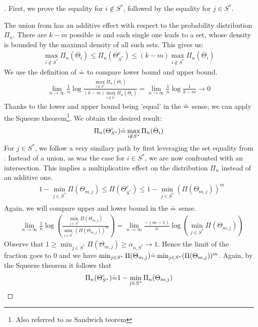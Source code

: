 \begin{proof}[]
  First, we prove the equality for $i \notin S^*$, followed by the equality for
  $j \in S^*$.

  The union from  has an additive effect with
  respect to the probability distribution $\Pi_n$. There are $k-m$ possible $i$s
  and each single one leads to a set, whose density is bounded by the maximal
  density of all such sets. This gives us:
  \begin{align}
    \max_{i \notin S^*} \Pi_n(\bar{\Theta}_i) \leq \Pi_n(\Theta_{S^*}^c) \leq (k-m) \max_{i \notin S^*} \Pi_n(\bar{\Theta}_i)
  \end{align}
  We use the definition of $\dot{=}$ to compare lower bound and upper bound.
  \begin{align}
    \lim_{n \rightarrow \infty} \frac{1}{n} \log{\frac{\max_{i \notin S^*} \Pi_n(\bar{\Theta}_i)}{(k-m)\max_{i \notin S^*} \Pi_n(\bar{\Theta}_i)}}
    = \lim_{n \rightarrow \infty} \frac{1}{n} \log{\frac{1}{k-m}} \rightarrow 0
  \end{align}
  Thanks to the lower and upper bound being 'equal' in the $\dot{=}$ sense, we can
  apply the Squeeze theorem\footnote{Also referred to as Sandwich teorem}. We
  obtain the desired result:
  \begin{align}
    \Pi_n(\Theta_{S^*}^c) \dot{=} \max_{i \notin S^*} \Pi_n(\bar{\Theta}_i)
  \end{align}
  For $j \in S^*$, we follow a very similary path by first leveraging the set
  equality from . Instead of a union, as was the
  case for $i \in S^*$, we are now confronted with an intersection. This implies
  a multiplicative effect on the distribution $\Pi_n$ instead of an additive
  one.
  \begin{align}
    &1 - \min_{j \in S^*} \Pi(\Theta_{m, j}) \leq \Pi(\Theta_{S^*}^c) \leq 1 - \min_{j \in S^*} (\Pi(\Theta_{m, j}))^m \\
  \end{align}
  Again, we will compare upper and lower bound in the $\dot{=}$ sense.
  \begin{align}
    &\lim_{n \rightarrow \infty} \frac{1}{n} \log(\frac{\min_{j \in S^*} \Pi(\Theta_{m, j})}{\min_{j \in S^*} (\Pi(\Theta_{m, j}))^m}) = \lim_{n \rightarrow \infty} \frac{-(m - 1)}{n} \log(\min_{j \in S^*} \Pi(\Theta_{m, j}))
  \end{align}
  Observe that $1 \geq \min_{j \in S^*} \Pi(\Theta_{m, j}) \geq \alpha_{n, S^*} \rightarrow 1$. Hence the limit of the fraction goes to 0 and we have $\min_{j \in S^*} \Pi(\Theta_{m, j}) \dot{=} \min_{j \in S^*} (\Pi(\Theta_{m, j}))^m$. Again, by the Squeeze theorem it follows that
  \begin{align}
    \Pi_n(\Theta_{S^*}^c) \dot{=} 1 - \min_{j \in S^*} \Pi_n(\Theta_{m, j})
  \end{align}
\end{proof}

